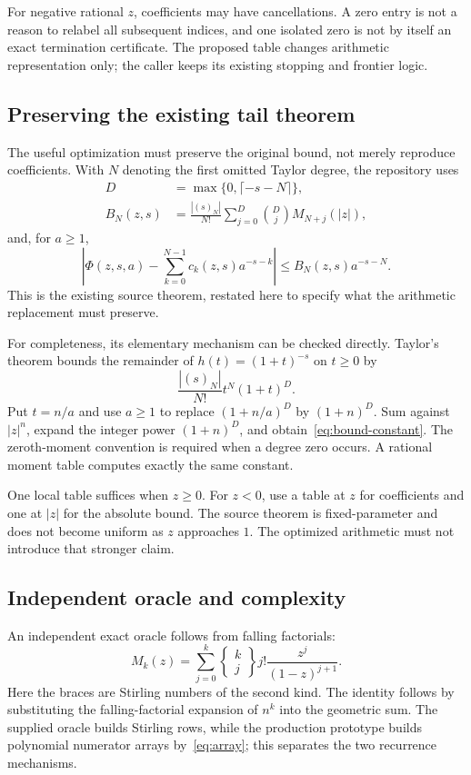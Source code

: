 \documentclass[11pt,letterpaper]{article}
\begin{document}
For negative rational $z$, coefficients may have cancellations. A zero entry is not a reason to relabel all subsequent indices, and one isolated zero is not by itself an exact termination certificate. The proposed table changes arithmetic representation only; the caller keeps its existing stopping and frontier logic.\cite{dirichlet}

\subsection{Preserving the existing tail theorem}
The useful optimization must preserve the original bound, not merely reproduce coefficients. With $N$ denoting the first omitted Taylor degree, the repository uses
\begin{align}
 D&=\max\{0,\lceil-s-N\rceil\},\\
 B_N(z,s)&=\frac{|(s)_N|}{N!}
  \sum_{j=0}^{D}\binom Dj M_{N+j}(|z|),
 \label{eq:bound-constant}
\end{align}
and, for $a\ge1$,
\begin{equation}
 \left|\Phi(z,s,a)-\sum_{k=0}^{N-1}c_k(z,s)a^{-s-k}\right|
 \le B_N(z,s)a^{-s-N}.
 \label{eq:lerch-bound}
\end{equation}
This is the existing source theorem, restated here to specify what the arithmetic replacement must preserve.\cite{dirichlet}

For completeness, its elementary mechanism can be checked directly. Taylor's theorem bounds the remainder of $h(t)=(1+t)^{-s}$ on $t\ge0$ by
\[
 \frac{|(s)_N|}{N!}t^N(1+t)^D.
\]
Put $t=n/a$ and use $a\ge1$ to replace $(1+n/a)^D$ by $(1+n)^D$. Sum against $|z|^n$, expand the integer power $(1+n)^D$, and obtain~\eqref{eq:bound-constant}. The zeroth-moment convention is required when a degree zero occurs. A rational moment table computes exactly the same constant.

One local table suffices when $z\ge0$. For $z<0$, use a table at $z$ for coefficients and one at $|z|$ for the absolute bound. The source theorem is fixed-parameter and does not become uniform as $z$ approaches $1$. The optimized arithmetic must not introduce that stronger claim.

\subsection{Independent oracle and complexity}
An independent exact oracle follows from falling factorials:
\begin{equation}
 M_k(z)=\sum_{j=0}^k
 \left\{\!\begin{matrix}k\\j\end{matrix}\!\right\}
 j!\frac{z^j}{(1-z)^{j+1}}.
 \label{eq:stirling}
\end{equation}
Here the braces are Stirling numbers of the second kind. The identity follows by substituting the falling-factorial expansion of $n^k$ into the geometric sum. The supplied oracle builds Stirling rows, while the production prototype builds polynomial numerator arrays by~\eqref{eq:array}; this separates the two recurrence mechanisms.
\end{document}
